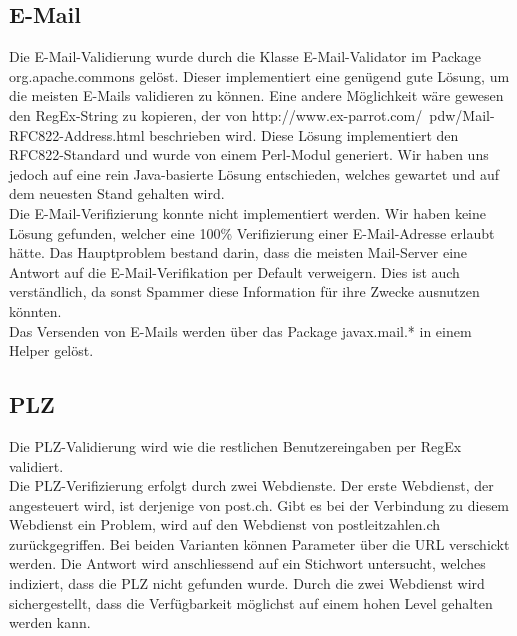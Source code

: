 \documentclass[12pt]{scrartcl}
\begin{document}
\subsection{E-Mail}
Die E-Mail-Validierung wurde durch die Klasse E-Mail-Validator im Package org.apache.commons gelöst. Dieser implementiert eine genügend gute Lösung, um die meisten E-Mails validieren zu können. Eine andere Möglichkeit wäre gewesen den RegEx-String zu kopieren, der von http://www.ex-parrot.com/~pdw/Mail-RFC822-Address.html beschrieben wird. Diese Lösung implementiert den RFC822-Standard und wurde von einem Perl-Modul generiert. Wir haben uns jedoch auf eine rein Java-basierte Lösung entschieden, welches gewartet und auf dem neuesten Stand gehalten wird.\\
Die E-Mail-Verifizierung konnte nicht implementiert werden. Wir haben keine Lösung gefunden, welcher eine 100\% Verifizierung einer E-Mail-Adresse erlaubt hätte. Das Hauptproblem bestand darin, dass die meisten Mail-Server eine Antwort auf die E-Mail-Verifikation per Default verweigern. Dies ist auch verständlich, da sonst Spammer diese Information für ihre Zwecke ausnutzen könnten.\\
Das Versenden von E-Mails werden über das Package javax.mail.* in einem Helper gelöst.

\subsection{PLZ}
Die PLZ-Validierung wird wie die restlichen Benutzereingaben per RegEx validiert.\\
Die PLZ-Verifizierung erfolgt durch zwei Webdienste. Der erste Webdienst, der angesteuert wird, ist derjenige von post.ch. Gibt es bei der Verbindung zu diesem Webdienst ein Problem, wird auf den Webdienst von postleitzahlen.ch zurückgegriffen. Bei beiden Varianten können Parameter über die URL verschickt werden. Die Antwort wird anschliessend auf ein Stichwort untersucht, welches indiziert, dass die PLZ nicht gefunden wurde. Durch die zwei Webdienst wird sichergestellt, dass die Verfügbarkeit möglichst auf einem hohen Level gehalten werden kann.
\end{document}
